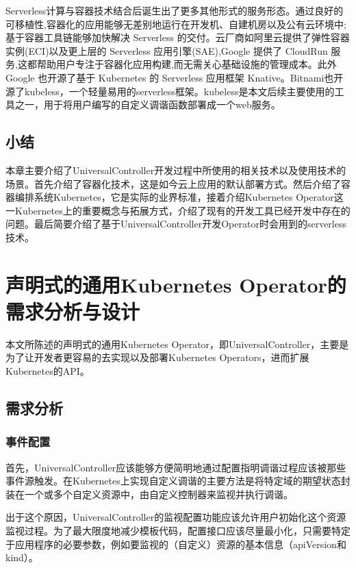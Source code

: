 \documentclass[macfonts,master]{njuthesis}
\begin{document}
Serverless计算与容器技术结合后诞生出了更多其他形式的服务形态。通过良好的可移植性,容器化的应用能够无差别地运行在开发机、自建机房以及公有云环境中; 基于容器工具链能够加快解决 Serverless 的交付。云厂商如阿里云提供了弹性容器实例(ECI)以及更上层的 Serverless 应用引擎(SAE),Google 提供了 CloudRun 服务,这都帮助用户专注于容器化应用构建,而无需关心基础设施的管理成本。此外 Google 也开源了基于 Kubernetes 的 Serverless 应用框架 Knative。Bitnami也开源了kubeless，一个轻量易用的serverless框架。kubeless是本文后续主要使用的工具之一，用于将用户编写的自定义调谐函数部署成一个web服务。

\section{小结}
本章主要介绍了UniversalController开发过程中所使用的相关技术以及使用技术的场景。首先介绍了容器化技术，这是如今云上应用的默认部署方式。然后介绍了容器编排系统Kubernetes，它是实际的业界标准，接着介绍Kubernetes Operator这一Kubernetes上的重要概念与拓展方式，介绍了现有的开发工具已经开发中存在的问题。最后简要介绍了基于UniversalController开发Operator时会用到的serverless技术。

\chapter{声明式的通用Kubernetes Operator的需求分析与设计}\label{chapter_framework}
本文所陈述的声明式的通用Kubernetes Operator，即UniversalController，主要是为了让开发者更容易的去实现以及部署Kubernetes Operators，进而扩展Kubernetes的API。

\section{需求分析}

\subsection{事件配置}
首先，UniversalController应该能够方便简明地通过配置指明调谐过程应该被那些事件源触发。在Kubernetes上实现自定义调谐的主要方法是将特定域的期望状态封装在一个或多个自定义资源中，由自定义控制器来监视并执行调谐。

出于这个原因，UniversalController的监视配置功能应该允许用户初始化这个资源监视过程。为了最大限度地减少模板代码，配置接口应该尽量最小化，只需要特定于应用程序的必要参数，例如要监视的（自定义）资源的基本信息（apiVersion和kind）。
\end{document}

